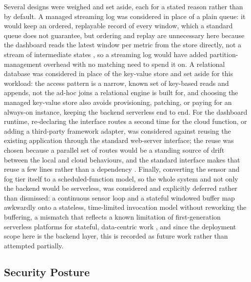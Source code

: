 \documentclass[conference]{IEEEtran}
\begin{document}
Several designs were weighed and set aside, each for a stated reason rather than by default. A managed streaming log was considered in place of a plain queue: it would keep an ordered, replayable record of every window, which a standard queue does not guarantee, but ordering and replay are unnecessary here because the dashboard reads the latest window per metric from the store directly, not a stream of intermediate states \cite{ref6}, so a streaming log would have added partition-management overhead with no matching need to spend it on. A relational database was considered in place of the key-value store and set aside for this workload: the access pattern is a narrow, known set of key-based reads and appends, not the ad-hoc joins a relational engine is built for, and choosing the managed key-value store also avoids provisioning, patching, or paying for an always-on instance, keeping the backend serverless end to end. For the dashboard runtime, re-declaring the interface routes a second time for the cloud function, or adding a third-party framework adapter, was considered against reusing the existing application through the standard web-server interface; the reuse was chosen because a parallel set of routes would be a standing source of drift between the local and cloud behaviours, and the standard interface makes that reuse a few lines rather than a dependency \cite{ref9}. Finally, converting the sensor and fog tier itself to a scheduled-function model, so the whole system and not only the backend would be serverless, was considered and explicitly deferred rather than dismissed: a continuous sensor loop and a stateful windowed buffer map awkwardly onto a stateless, time-limited invocation model without reworking the buffering, a mismatch that reflects a known limitation of first-generation serverless platforms for stateful, data-centric work \cite{ref8}, and since the deployment scope here is the backend layer, this is recorded as future work rather than attempted partially.

\subsection{Security Posture}
\end{document}
